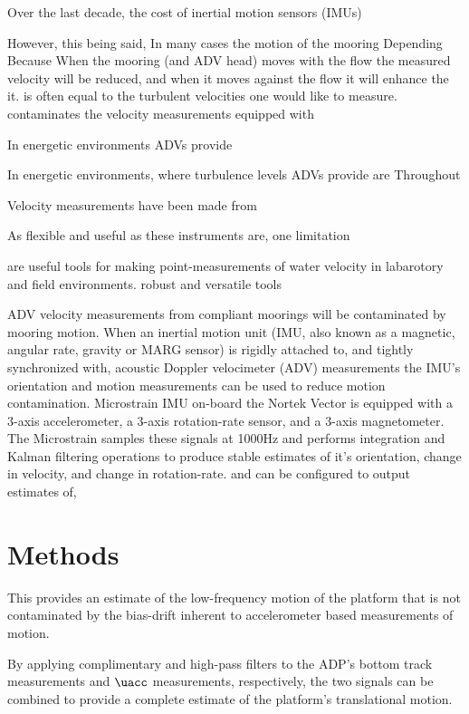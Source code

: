 Over the last decade, the cost of inertial motion sensors (IMUs)

However, this being said,  In many cases the motion of the mooring Depending Because When the mooring (and ADV head) moves with the flow the measured velocity will be reduced, and when it moves against the flow it will enhance the it. is often equal to the turbulent velocities one would like to measure. contaminates the velocity measurements  equipped with 

In energetic environments ADVs provide 

In energetic environments, where turbulence levels ADVs provide are Throughout 

Velocity measurements have been made from 

As flexible and useful as these instruments are, one limitation 

are useful tools for making point-measurements of water velocity in labarotory and field environments. 
robust and versatile tools 

  ADV velocity measurements from compliant moorings will be contaminated by mooring motion. When an inertial motion unit (IMU, also known as a magnetic, angular rate, gravity or MARG sensor) is rigidly attached to, and tightly synchronized with, acoustic Doppler velocimeter (ADV) measurements the IMU's orientation and motion measurements can be used to reduce motion contamination.  Microstrain IMU on-board the Nortek Vector is equipped with a 3-axis accelerometer, a 3-axis rotation-rate sensor, and a 3-axis magnetometer.  The Microstrain samples these signals at 1000Hz and performs integration and Kalman filtering operations to produce stable estimates of it's orientation, change in velocity, and change in rotation-rate.  and  can be configured to output estimates of,


\section{Methods}


This provides an estimate of the low-frequency motion of the platform that is not contaminated by the bias-drift inherent to accelerometer based measurements of motion. 

By applying complimentary and high-pass filters to the ADP's bottom track measurements and $\uacc$ measurements, respectively, the two signals can be combined to provide a complete estimate of the platform's translational motion.


